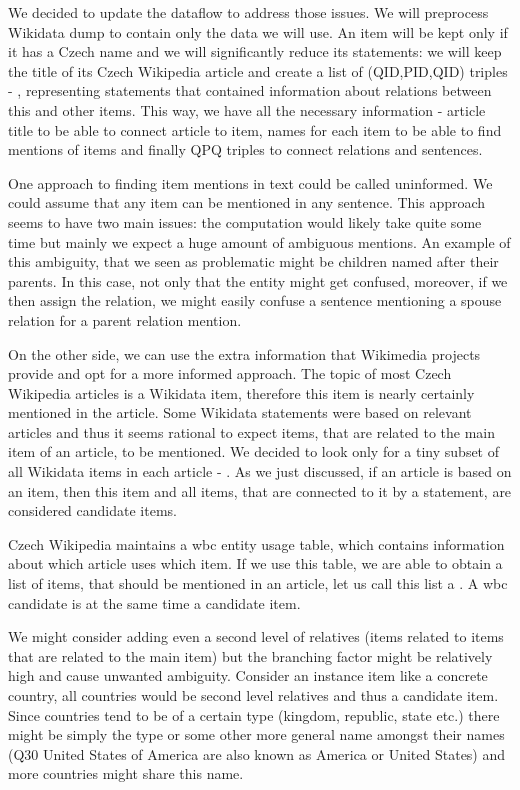 We decided to update the dataflow to address those issues. We will preprocess Wikidata dump to contain only the data we will use. An item will be kept only if it has a Czech name and we will significantly reduce its statements: we will keep the title of its Czech Wikipedia article and create a list of (QID,PID,QID) triples - , representing statements that contained information about relations between this and other items. This way, we have all the necessary information - article title to be able to connect article to item, names for each item to be able to find mentions of items and finally QPQ triples to connect relations and sentences.

One approach to finding item mentions in text could be called uninformed. We could assume that any item can be mentioned in any sentence. This approach seems to have two main issues: the computation would likely take quite some time but mainly we expect a huge amount of ambiguous mentions. An example of this ambiguity, that we seen as problematic might be children named after their parents. In this case, not only that the entity might get confused, moreover, if we then assign the relation, we might easily confuse a sentence mentioning a spouse relation for a parent relation mention.

On the other side, we can use the extra information that Wikimedia projects provide and opt for a more informed approach. The topic of most Czech Wikipedia articles is a Wikidata item, therefore this item is nearly certainly mentioned in the article. Some Wikidata statements were based on relevant articles and thus it seems rational to expect items, that are related to the main item of an article, to be mentioned. We decided to look only for a tiny subset of all Wikidata items in each article - . As we just discussed, if an article is based on an item, then this item and all items, that are connected to it by a statement, are considered candidate items.

Czech Wikipedia maintains a wbc entity usage table, which contains information about which article uses which item. If we use this table, we are able to obtain a list of items, that should be mentioned in an article, let us call this list a . A wbc candidate is at the same time a candidate item.

We might consider adding even a second level of relatives (items related to items that are related to the main item) but the branching factor might be relatively high and cause unwanted ambiguity. Consider an instance item like a concrete country, all countries would be second level relatives and thus a candidate item. Since countries tend to be of a certain type (kingdom, republic, state etc.) there might be simply the type or some other more general name amongst their names (Q30 United States of America are also known as America or United States) and more countries might share this name.

